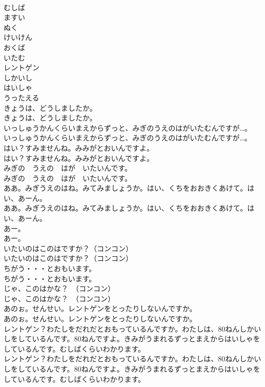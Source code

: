 \documentclass[8pt]{extreport}
\begin{document}
\begin{CJK}{UTF8}{min}
\\	むしば
\\	ますい
\\	ぬく
\\	けいけん
\\	おくば
\\	いたむ
\\	レントゲン
\\	しかいし
\\	はいしゃ
\\	うったえる
\\	きょうは、どうしましたか。
\\	きょうは、どうしましたか。
\\	いっしゅうかんくらいまえからずっと、みぎのうえのはがいたむんですが…。
\\	いっしゅうかんくらいまえからずっと、みぎのうえのはがいたむんですが…。
\\	はい？すみませんね。みみがとおいんですよ。
\\	はい？すみませんね。みみがとおいんですよ。
\\	みぎの　うえの　はが　いたいんです。
\\	みぎの　うえの　はが　いたいんです。
\\	ああ。みぎうえのはね。みてみましょうか。はい、くちをおおきくあけて。はい、あーん。
\\	ああ。みぎうえのはね。みてみましょうか。はい、くちをおおきくあけて。はい、あーん。
\\	あー。
\\	あー。
\\	いたいのはこのはですか？（コンコン）
\\	いたいのはこのはですか？（コンコン）
\\	ちがう・・・とおもいます。
\\	ちがう・・・とおもいます。
\\	じゃ、このはかな？　（コンコン）
\\	じゃ、このはかな？　（コンコン）
\\	あのぉ。せんせい。レントゲンをとったりしないんですか。
\\	あのぉ。せんせい。レントゲンをとったりしないんですか。
\\	レントゲン？わたしをだれだとおもっているんですか。わたしは、80ねんしかいしをしているんです。80ねんですよ。きみがうまれるずっとまえからはいしゃをしているんです。むしばくらいわかります。
\\	レントゲン？わたしをだれだとおもっているんですか。わたしは、80ねんしかいしをしているんです。80ねんですよ。きみがうまれるずっとまえからはいしゃをしているんです。むしばくらいわかります。

\end{CJK}
\end{document}
